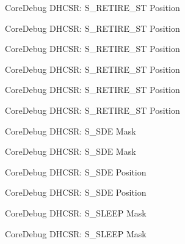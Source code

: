 \begin{DoxyRefList}
\label{deprecated__deprecated000111}%
%
Core\+Debug D\+H\+C\+SR\+: S\+\_\+\+R\+E\+T\+I\+R\+E\+\_\+\+ST Position 

\label{deprecated__deprecated000165}%
%
Core\+Debug D\+H\+C\+SR\+: S\+\_\+\+R\+E\+T\+I\+R\+E\+\_\+\+ST Position 

\label{deprecated__deprecated000250}%
%
Core\+Debug D\+H\+C\+SR\+: S\+\_\+\+R\+E\+T\+I\+R\+E\+\_\+\+ST Position 

\label{deprecated__deprecated000307}%
%
Core\+Debug D\+H\+C\+SR\+: S\+\_\+\+R\+E\+T\+I\+R\+E\+\_\+\+ST Position 

\label{deprecated__deprecated000383}%
%
Core\+Debug D\+H\+C\+SR\+: S\+\_\+\+R\+E\+T\+I\+R\+E\+\_\+\+ST Position 

\label{deprecated__deprecated000462}%
%
Core\+Debug D\+H\+C\+SR\+: S\+\_\+\+R\+E\+T\+I\+R\+E\+\_\+\+ST Position  
\item[Member \mbox{\hyperlink{group__CMSIS__CoreDebug_ga67f2b2b6729ab2db89f97bbe75224e9d}{Core\+Debug\+\_\+\+D\+H\+C\+S\+R\+\_\+\+S\+\_\+\+S\+D\+E\+\_\+\+Msk}} ]\label{deprecated__deprecated000020}%
%
Core\+Debug D\+H\+C\+SR\+: S\+\_\+\+S\+DE Mask 

\label{deprecated__deprecated000471}%
%
Core\+Debug D\+H\+C\+SR\+: S\+\_\+\+S\+DE Mask  
\item[Member \mbox{\hyperlink{group__CMSIS__CoreDebug_ga34b00f5a0109d236647be6609d6f04b3}{Core\+Debug\+\_\+\+D\+H\+C\+S\+R\+\_\+\+S\+\_\+\+S\+D\+E\+\_\+\+Pos}} ]\label{deprecated__deprecated000019}%
%
Core\+Debug D\+H\+C\+SR\+: S\+\_\+\+S\+DE Position 

\label{deprecated__deprecated000470}%
%
Core\+Debug D\+H\+C\+SR\+: S\+\_\+\+S\+DE Position  
\item[Member \mbox{\hyperlink{group__CMSIS__CoreDebug_ga98d51538e645c2c1a422279cd85a0a25}{Core\+Debug\+\_\+\+D\+H\+C\+S\+R\+\_\+\+S\+\_\+\+S\+L\+E\+E\+P\+\_\+\+Msk}} ]\label{deprecated__deprecated000024}%
%
Core\+Debug D\+H\+C\+SR\+: S\+\_\+\+S\+L\+E\+EP Mask 

\label{deprecated__deprecated000116}%
%
Core\+Debug D\+H\+C\+SR\+: S\+\_\+\+S\+L\+E\+EP Mask 


\end{DoxyRefList}

